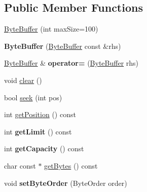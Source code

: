 \subsection*{Public Member Functions}
\begin{DoxyCompactItemize}
\item 
\hyperlink{classisat__utils_1_1_byte_buffer_a9f4312493a433a005346b3f777d82c2a}{Byte\+Buffer} (int max\+Size=100)
\item 
{\bfseries Byte\+Buffer} (\hyperlink{classisat__utils_1_1_byte_buffer}{Byte\+Buffer} const \&rhs)\hypertarget{classisat__utils_1_1_byte_buffer_aac59d94f64a6e230092bb58a231f17ad}{}\label{classisat__utils_1_1_byte_buffer_aac59d94f64a6e230092bb58a231f17ad}

\item 
\hyperlink{classisat__utils_1_1_byte_buffer}{Byte\+Buffer} \& {\bfseries operator=} (\hyperlink{classisat__utils_1_1_byte_buffer}{Byte\+Buffer} rhs)\hypertarget{classisat__utils_1_1_byte_buffer_ae9e5d0ce671455c3ea0ef6b1177b6545}{}\label{classisat__utils_1_1_byte_buffer_ae9e5d0ce671455c3ea0ef6b1177b6545}

\item 
void \hyperlink{classisat__utils_1_1_byte_buffer_aba7629c0a1f32a7c8bc1fb0b7aa25d84}{clear} ()
\item 
bool \hyperlink{classisat__utils_1_1_byte_buffer_a713fea8a50894c0de09c5bac0a75d5f6}{seek} (int pos)
\item 
int \hyperlink{classisat__utils_1_1_byte_buffer_ac7936db245374ce1a91f50974108bf81}{get\+Position} () const 
\item 
int {\bfseries get\+Limit} () const \hypertarget{classisat__utils_1_1_byte_buffer_a916ff3ebb1c1f3b5961ed4518a57778a}{}\label{classisat__utils_1_1_byte_buffer_a916ff3ebb1c1f3b5961ed4518a57778a}

\item 
int {\bfseries get\+Capacity} () const \hypertarget{classisat__utils_1_1_byte_buffer_ae82ac9a8ea9a9cbad5017dbb9f3264f6}{}\label{classisat__utils_1_1_byte_buffer_ae82ac9a8ea9a9cbad5017dbb9f3264f6}

\item 
char const $\ast$ \hyperlink{classisat__utils_1_1_byte_buffer_abfd9c2f3bce4061d1e6111d6196bf652}{get\+Bytes} () const 
\item 
void {\bfseries set\+Byte\+Order} (Byte\+Order order)\hypertarget{classisat__utils_1_1_byte_buffer_a441e4ae0439dcef442075d9e9e702d5b}{}\label{classisat__utils_1_1_byte_buffer_a441e4ae0439dcef442075d9e9e702d5b}


\end{DoxyCompactItemize}
